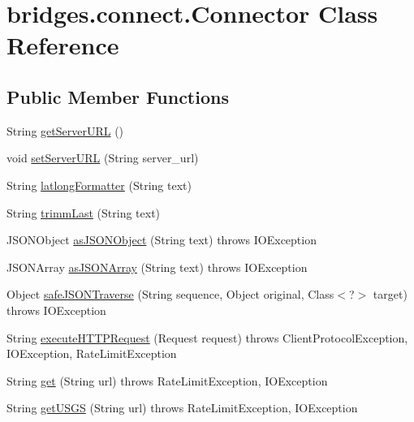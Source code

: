 \hypertarget{classbridges_1_1connect_1_1_connector}{}\section{bridges.\+connect.\+Connector Class Reference}
\label{classbridges_1_1connect_1_1_connector}
\subsection*{Public Member Functions}
\begin{DoxyCompactItemize}
\item 
String \hyperlink{classbridges_1_1connect_1_1_connector_a0b9809180aac96a83e31e224ab5ed6ec}{get\+Server\+U\+RL} ()
\item 
void \hyperlink{classbridges_1_1connect_1_1_connector_a71f449c91e529f79730df27e01fdf674}{set\+Server\+U\+RL} (String server\+\_\+url)
\item 
String \hyperlink{classbridges_1_1connect_1_1_connector_a2318cd93d18ef58285598f6f9cdf727b}{latlong\+Formatter} (String text)
\item 
String \hyperlink{classbridges_1_1connect_1_1_connector_ac0dca0bd99b6abbbd8a77874a95e6d49}{trimm\+Last} (String text)
\item 
J\+S\+O\+N\+Object \hyperlink{classbridges_1_1connect_1_1_connector_aac3fb75dd7975c4439cfd1bf6cefe0a6}{as\+J\+S\+O\+N\+Object} (String text)  throws I\+O\+Exception 
\item 
J\+S\+O\+N\+Array \hyperlink{classbridges_1_1connect_1_1_connector_aa5bd647713545fa24c6d730eacb6bc54}{as\+J\+S\+O\+N\+Array} (String text)  throws I\+O\+Exception 
\item 
Object \hyperlink{classbridges_1_1connect_1_1_connector_ab7d1d242fbf9acade316650e54a3d020}{safe\+J\+S\+O\+N\+Traverse} (String sequence, Object original, Class$<$?$>$ target)  throws I\+O\+Exception 
\item 
String \hyperlink{classbridges_1_1connect_1_1_connector_aabcfde23d155c8c42edb8a1407320bc5}{execute\+H\+T\+T\+P\+Request} (Request request)  throws Client\+Protocol\+Exception, I\+O\+Exception, Rate\+Limit\+Exception 
\item 
String \hyperlink{classbridges_1_1connect_1_1_connector_aec8d54bf707c50d6f8173a0c1640fcd5}{get} (String url)  throws Rate\+Limit\+Exception, I\+O\+Exception 
\item 
String \hyperlink{classbridges_1_1connect_1_1_connector_a1781405c9b38c338bce042bf7ff23eaf}{get\+U\+S\+GS} (String url)  throws Rate\+Limit\+Exception, I\+O\+Exception

\end{DoxyCompactItemize}
